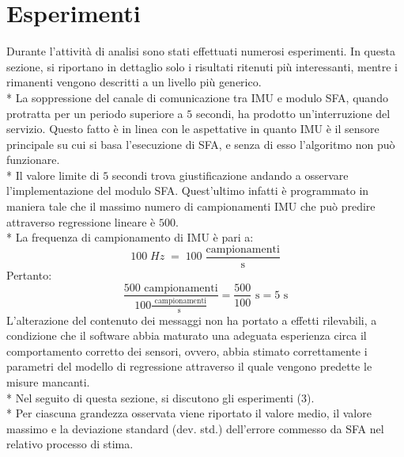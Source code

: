 \section{Esperimenti}
Durante l'attivit\`a di analisi sono stati effettuati numerosi esperimenti. In questa sezione, si riportano in dettaglio solo i risultati ritenuti pi\`u interessanti, mentre i rimanenti vengono descritti a un livello pi\`u generico.\\*
La soppressione del canale di comunicazione tra IMU e modulo SFA, quando protratta per un periodo superiore a $5$ secondi, ha prodotto un'interruzione del servizio. Questo fatto \`e in linea con le aspettative in quanto IMU \`e il sensore principale su cui si basa l'esecuzione di SFA, e senza di esso l'algoritmo non pu\`o funzionare.\\*
Il valore limite di $5$ secondi trova giustificazione andando a osservare l'implementazione del modulo SFA. Quest'ultimo infatti \`e programmato in maniera tale che il massimo numero di campionamenti IMU che pu\`o predire attraverso regressione lineare \`e $500$.\\*
La frequenza di campionamento di IMU \`e pari a:
$$100\;Hz\;=\;100\; \frac{\mbox{campionamenti}}{\mbox{s}}$$ Pertanto:
$$
\frac{500 \mbox{ campionamenti}}{100\frac{ \mbox{  campionamenti}}{\mbox{s}}} = \frac{500}{100}\mbox{ s} = 5\mbox{ s}
$$
L'alterazione del contenuto dei messaggi non ha portato a effetti rilevabili, a condizione che il software abbia maturato una adeguata esperienza circa il comportamento corretto dei sensori, ovvero, abbia stimato correttamente i parametri del modello di regressione attraverso il quale vengono predette le misure mancanti.\\*
Nel seguito di questa sezione, si discutono gli esperimenti (3).\\*
Per ciascuna grandezza osservata viene riportato il valore medio, il valore
massimo e la deviazione standard (dev. std.) dell'errore commesso da SFA nel relativo processo di stima.
